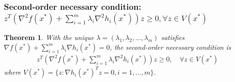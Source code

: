 \documentclass[11pt,a4paper]{article}
\newtheorem{theorem}{Theorem}
\begin{document}
\subsubsection{Second-order necessary condition: $z^T\left(\nabla^2 f(x^*)+\sum_{i=1}^m\lambda_i \nabla^2 h_i(x^*)\right)z\geq 0,\forall z\in V(x^*)$}
\begin{theorem}
    With the unique $\lambda=(\lambda_1,\lambda_2,...,\lambda_m)$ satisfies $\nabla f(x^*)+\sum_{i=1}^m\lambda_i \nabla h_i(x^*)=0$, the second-order necessary condition is
    \begin{equation}
        \begin{aligned}
            z^T\left(\nabla^2 f(x^*)+\sum_{i=1}^m\lambda_i \nabla^2 h_i(x^*)\right)z\geq 0,\quad \forall z\in V(x^*)
        \end{aligned}
        \nonumber
    \end{equation}
    where $V(x^*)=\{z:\nabla h_i(x^*)^Tz=0,i=1,...,m\}$.
\end{theorem}
\end{document}
